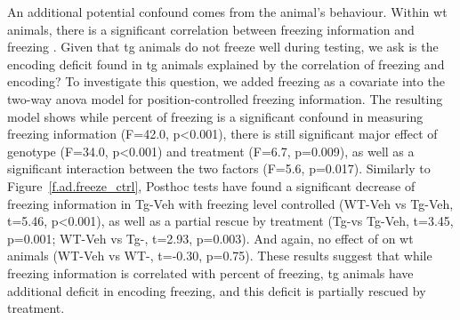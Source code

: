 An additional potential confound comes from the animal's behaviour. Within \gls{wt} animals, there is a significant correlation between freezing information and freezing . Given that \gls{tg} animals do not freeze well during testing, we ask is the encoding deficit found in \gls{tg} animals explained by the correlation of freezing and encoding? To investigate this question, we added freezing as a covariate into the two-way \gls{anova} model for position-controlled freezing information. The resulting model shows while percent of freezing is a significant confound in measuring freezing information (F=42.0, p<0.001), there is still significant major effect of genotype (F=34.0, p<0.001) and treatment (F=6.7, p=0.009), as well as a significant interaction between the two factors (F=5.6, p=0.017). Similarly to Figure~\ref{f.ad.freeze_ctrl}, Posthoc tests have found a significant decrease of freezing information in Tg-Veh with freezing level controlled (WT-Veh vs Tg-Veh, t=5.46, p<0.001), as well as a partial rescue by \tglu treatment (Tg-\tglu vs Tg-Veh, t=3.45, p=0.001; WT-Veh vs Tg-\tglu, t=2.93, p=0.003). And again, no effect of \tglu on \gls{wt} animals (WT-Veh vs WT-\tglu, t=-0.30, p=0.75). These results suggest that while freezing information is correlated with percent of freezing, \gls{tg} animals have additional deficit in encoding freezing, and this deficit is partially rescued by \tglu treatment. 

